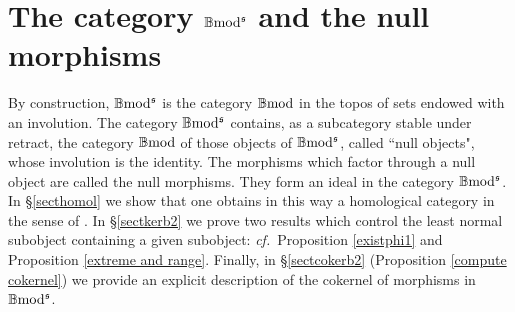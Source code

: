 \documentclass[12pt]{article}
\def\B{{\mathbb B}}
\newcommand{\cf}{{\it cf.}}
\def\bmod{{\rm \B mod}}
\def\b2{{\rm \B mod^{\mathfrak s}}}
\begin{document}
\section{The category $\b2$ and the null morphisms}\label{sectnullmorphisms}
By construction,  $\b2$ is the category $\bmod$ in the topos of sets endowed with an involution. The category $\b2$ contains, as a subcategory stable under retract, the category $\bmod$ of those objects of $\b2$, called ``null objects", whose involution is the identity. 
The morphisms which factor through a null object are called the null morphisms. They form   an ideal 
\cite{Ehresmann, Lavendhomme} in the category $\b2$. In \S\ref{secthomol} we show
that one obtains in this way a homological category in the sense of \cite{gra1}. In \S\ref{sectkerb2} we prove two results which control the least normal subobject containing a given subobject: \cf~Proposition \ref{existphi1} and Proposition \ref{extreme and range}. Finally, in \S\ref{sectcokerb2} (Proposition \ref{compute cokernel}) we provide  an explicit description of the cokernel of morphisms in $\b2$.


  
\end{document}
